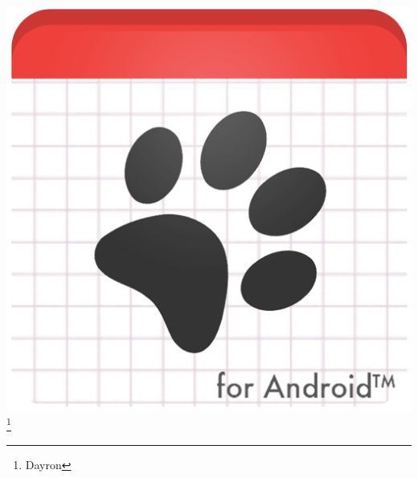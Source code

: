 \documentclass[14pt]{beamer}
\begin{document}
\begin{frame}
\begin{itemize}
\includegraphics[scale =0.09]{Images/DogH.png}
\footnote{Dayron}
\end{itemize}
\end{frame}
\end{document}
